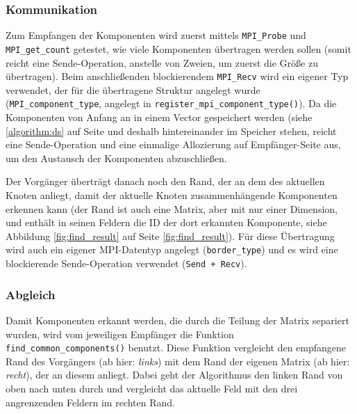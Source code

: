 \subsubsection{Kommunikation}

Zum Empfangen der Komponenten wird zuerst mittels \verb+MPI_Probe+ und \verb+MPI_get_count+ getestet, wie viele Komponenten übertragen werden sollen (somit reicht eine Sende-Operation, anstelle von Zweien, um zuerst die Größe zu übertragen). Beim anschließenden blockierendem \verb+MPI_Recv+ wird ein eigener Typ verwendet, der für die übertragene Struktur angelegt wurde (\verb+MPI_component_type+, angelegt in \verb+register_mpi_component_type()+). Da die Komponenten von Anfang an in einem Vector gespeichert werden (siehe \ref{algorithm:ds} auf Seite \pageref{algorithm:ds} und deshalb hintereinander im Speicher stehen, reicht eine Sende-Operation und eine einmalige Allozierung auf Empfänger-Seite aus, um den Austausch der Komponenten abzuschließen.

Der Vorgänger überträgt danach noch den Rand, der an dem des aktuellen Knoten anliegt, damit der aktuelle Knoten zusammenhängende Komponenten erkennen kann (der Rand ist auch eine Matrix, aber mit nur einer Dimension, und enthält in seinen Feldern die ID der dort erkannten Komponente, siehe Abbildung \ref{fig:find_result} auf Seite \ref{fig:find_result}). Für diese Übertragung wird auch ein eigener MPI-Datentyp angelegt (\verb+border_type+) und es wird eine blockierende Sende-Operation verwendet (\verb$Send + Recv$).

\subsubsection{Abgleich}

Damit Komponenten erkannt werden, die durch die Teilung der Matrix separiert wurden, wird vom jeweiligen Empfänger die Funktion \verb+find_common_components()+ benutzt. Diese Funktion vergleicht den empfangene Rand des Vorgängers (ab hier: \textit{links}) mit dem Rand der eigenen Matrix (ab hier: \textit{recht}), der an diesem anliegt. Dabei geht der Algorithmus den linken Rand von oben nach unten durch und vergleicht das aktuelle Feld mit den drei angrenzenden Feldern im rechten Rand.

